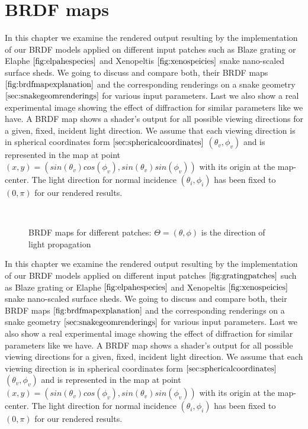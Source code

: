 \section{BRDF maps}
In this chapter we examine the rendered output resulting by the implementation of our BRDF models applied on different input patches such as Blaze grating or Elaphe $\ref{fig:elpahespecies}$ and Xenopeltis $\ref{fig:xenospeicies}$ snake nano-scaled surface sheds. We going to discuss and compare both, their BRDF maps $\ref{fig:brdfmapexplanation}$ and the corresponding renderings on a snake geometry $\ref{sec:snakegeomrenderings}$ for various input parameters. Last we also show a real experimental image showing the effect of diffraction for similar parameters like we have. 
A BRDF map shows a shader's output for all possible viewing directions for a given, fixed, incident light direction. We assume that each viewing direction is in spherical coordinates form $\ref{sec:sphericalcoordinates}$ $(\theta_v, \phi_v)$ and is represented in the map at point $(x,y) = (sin(\theta_v)cos(\phi_v), sin(\theta_v)sin(\phi_v))$ with its origin at the map-center. The light direction for normal incidence $(\theta_i, \phi_i)$ has been fixed to $(0,\pi)$ for our rendered results.

\begin{figure}[H]
  \centering
~
~

\caption{BRDF maps for different patches: $\Theta=(\theta,\phi)$ is the direction of light propagation}
\label{fig:brdfmapexplanation}
\end{figure}

In this chapter we examine the rendered output resulting by the implementation of our BRDF models applied on different input patches $\ref{fig:gratingpatches}$ such as Blaze grating or Elaphe $\ref{fig:elpahespecies}$ and Xenopeltis $\ref{fig:xenospeicies}$ snake nano-scaled surface sheds. We going to discuss and compare both, their BRDF maps $\ref{fig:brdfmapexplanation}$ and the corresponding renderings on a snake geometry $\ref{sec:snakegeomrenderings}$ for various input parameters. Last we also show a real experimental image showing the effect of diffraction for similar parameters like we have. 
A BRDF map shows a shader's output for all possible viewing directions for a given, fixed, incident light direction. We assume that each viewing direction is in spherical coordinates form $\ref{sec:sphericalcoordinates}$ $(\theta_v, \phi_v)$ and is represented in the map at point $(x,y) = (sin(\theta_v)cos(\phi_v), sin(\theta_v)sin(\phi_v))$ with its origin at the map-center. The light direction for normal incidence $(\theta_i, \phi_i)$ has been fixed to $(0,\pi)$ for our rendered results.

